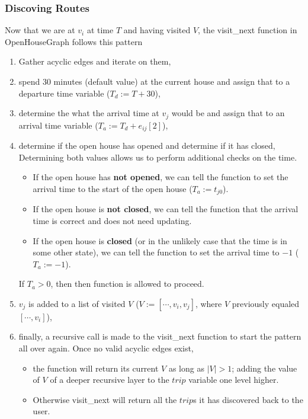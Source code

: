 \documentclass[letterpaper,11pt]{report}
\theoremstyle{definition}
\theoremstyle{definition}
\begin{document}
\subsubsection{Discoving Routes}
Now that we are at $v_i$ at time $T$ and having visited $V$, the \textsf{visit\_next} function in \textsf{OpenHouseGraph} follows this pattern
\begin{enumerate}
  \item Gather acyclic edges and iterate on them,
  \item spend 30 minutes (default value) at the current house and assign that to a departure time variable ($T_d := T + 30$),
  \item determine the what the arrival time at $v_j$ would be and assign that to an arrival time variable ($T_a := T_d + e_{ij}[2]$),
  \item determine if the open house has opened and determine if it has closed,\\
  \hspace*{0.5em} Determining both values allows us to perform additional checks on the time.
    \begin{itemize}
      \item If the open house has \textbf{not opened}, we can tell the function to set the arrival time to the start of the open house ($T_a := t_{j0}$).
      \item If the open house is \textbf{not closed}, we can tell the function that the arrival time is correct and does not need updating.
      \item If the open house is \textbf{closed} (or in the unlikely case that the time is in some other state), we can tell the function to set the arrival time to $-1$ ($T_a := -1$).
    \end{itemize}
    \hspace*{0.5em} If $T_a > 0$, then then function is allowed to proceed.
  \item $v_j$ is added to a list of visited $V$ ($V := [\cdots , v_i, v_j]$, where $V$ previously equaled $[\cdots , v_i]$),
  \item finally, a recursive call is made to the \textsf{visit\_next} function to start the pattern all over again. Once no valid acyclic edges exist, 
    \begin{itemize}
      \item the function will return its current $V$ as long as $|V| > 1$; adding the value of $V$ of a deeper recursive layer to the $trip$ variable one level higher. 
      \item Otherwise \textsf{visit\_next} will return all the $trip$s it has discovered back to the user.
    \end{itemize}
\end{enumerate}
\end{document}
